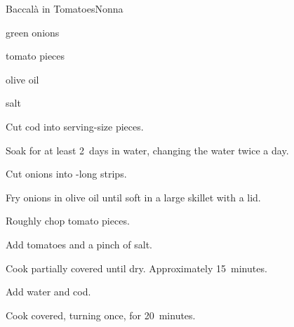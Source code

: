 \begin{recipe}{Baccalà in Tomatoes}{Nonna}{}

\begin{ingredients}
\item green onions
\item {}
\item tomato pieces
\item olive oil
\item salt
\end{ingredients}

\begin{directions}
\item Cut cod into serving-size pieces.
\item Soak for at least 2~days in water, changing the water twice a day.
\item Cut onions into -long strips.
\item Fry onions in olive oil until soft in a large skillet with a lid.
\item Roughly chop tomato pieces.
\item Add tomatoes and a pinch of salt.
\item Cook partially covered until dry. Approximately 15~minutes.
\item Add \C{\threequarter} water and cod.
\item Cook covered, turning once, for 20~minutes.
\end{directions}

\end{recipe}
